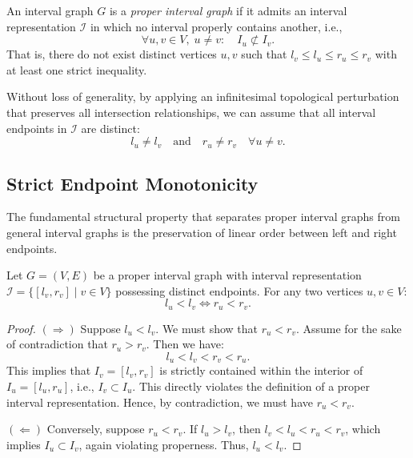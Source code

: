 \begin{definition}
An interval graph $G$ is a \emph{proper interval graph} if it admits an interval representation $\mathcal{I}$ in which no interval properly contains another, i.e.,
\begin{equation}
    \forall u, v \in V, \; u \ne v: \quad I_u \not\subset I_v.
\end{equation}
That is, there do not exist distinct vertices $u, v$ such that $l_v \le l_u \le r_u \le r_v$ with at least one strict inequality.
\end{definition}

Without loss of generality, by applying an infinitesimal topological perturbation that preserves all intersection relationships, we can assume that all interval endpoints in $\mathcal{I}$ are distinct:
\begin{equation}
    l_u \ne l_v \quad \text{and} \quad r_u \ne r_v \quad \forall u \ne v.
\end{equation}

\subsection{Strict Endpoint Monotonicity}

The fundamental structural property that separates proper interval graphs from general interval graphs is the preservation of linear order between left and right endpoints.

\begin{theorem}
\label{thm:endpoint_monotonicity}
Let $G = (V, E)$ be a proper interval graph with interval representation $\mathcal{I} = \{[l_v, r_v] \mid v \in V\}$ possessing distinct endpoints. For any two vertices $u, v \in V$:
\begin{equation}
    l_u < l_v \iff r_u < r_v.
\end{equation}
\end{theorem}
\begin{proof}
$(\Longrightarrow)$ Suppose $l_u < l_v$. We must show that $r_u < r_v$. Assume for the sake of contradiction that $r_u > r_v$. Then we have:
\[
    l_u < l_v < r_v < r_u.
\]
This implies that $I_v = [l_v, r_v]$ is strictly contained within the interior of $I_u = [l_u, r_u]$, i.e., $I_v \subset I_u$. This directly violates the definition of a proper interval representation. Hence, by contradiction, we must have $r_u < r_v$.

$(\Longleftarrow)$ Conversely, suppose $r_u < r_v$. If $l_u > l_v$, then $l_v < l_u < r_u < r_v$, which implies $I_u \subset I_v$, again violating properness. Thus, $l_u < l_v$.
\end{proof}

